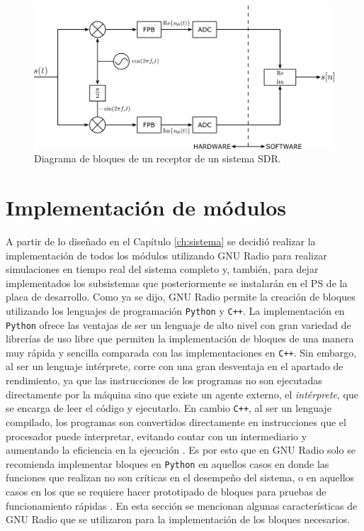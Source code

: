 \begin{figure}[ht!]
    \centering
    \includegraphics[width=0.9\linewidth]{images/07-GNURadio/gr_rx.png}
    \caption{Diagrama de bloques de un receptor de un sistema SDR.}
    \label{fig:gr_rx}
\end{figure}

\section{Implementación de módulos}
A partir de lo diseñado en el Capítulo \ref{ch:sistema} se decidió realizar la implementación de todos los módulos utilizando GNU Radio para realizar simulaciones en tiempo real del sistema completo y, también, para dejar implementados los subsistemas que posteriormente se instalarán en el PS de la placa de desarrollo. Como ya se dijo, GNU Radio permite la creación de bloques utilizando los lenguajes de programación \texttt{Python} y \texttt{C++}. La implementación en \texttt{Python} ofrece las ventajas de ser un lenguaje de alto nivel con gran variedad de librerías de uso libre que permiten la implementación de bloques de una manera muy rápida y sencilla comparada con las implementaciones en \texttt{C++}. Sin embargo, al ser un lenguaje intérprete, corre con una gran desventaja en el apartado de rendimiento, ya que las instrucciones de los programas no son ejecutadas directamente por la máquina sino que existe un agente externo, el \emph{intérprete}, que se encarga de leer el código y ejecutarlo. En cambio \texttt{C++}, al ser un lenguaje compilado, los programas son convertidos directamente en instrucciones que el procesador puede interpretar, evitando contar con un intermediario y aumentando la eficiencia en la ejecución \cite{bib:interpretevscompiled}. Es por esto que en GNU Radio solo se recomienda implementar bloques en \texttt{Python} en aquellos casos en donde las funciones que realizan no son críticas en el desempeño del sistema, o en aquellos casos en los que se requiere hacer prototipado de bloques para pruebas de funcionamiento rápidas \cite{bib:federico_larocca}.
En esta sección se mencionan algunas características de GNU Radio que se utilizaron para la implementación de los bloques necesarios.

